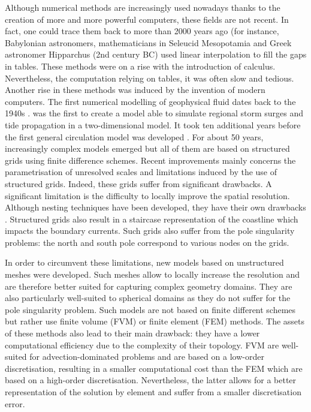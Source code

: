 Although numerical methods are increasingly used nowadays thanks to the creation of more and more powerful computers, these fields are not recent. In fact, one could trace them back to more than 2000 years ago (for instance, Babylonian astronomers, mathematicians in Seleucid Mesopotamia and Greek astronomer Hipparchus (2nd century BC) used linear interpolation to fill the gaps in tables. These methods were on a rise with the introduction of calculus. Nevertheless, the computation relying on tables, it was often slow and tedious. Another rise in these methods was induced by the invention of modern computers. The first numerical modelling of geophysical fluid dates back to the 1940s \citep{cushman2011introduction}. \citet{hansen1956theorie} was the first to create a model able to simulate regional storm surges and tide propagation in a two-dimensional model. It took ten additional years before the first general circulation model was developed \citep{bryan1967numerical}. For about 50 years, increasingly complex models emerged but all of them are based on structured grids using finite difference schemes. Recent improvements mainly concerns the parametrisation of unresolved scales and limitations induced by the use of structured grids. Indeed, these grids suffer from significant drawbacks. A significant limitation is the difficulty to locally improve the spatial resolution. Although nesting techniques have been developed, they have their own drawbacks \citep[see, e.g.,][]{hanert2004advection}. Structured grids also result in a staircase representation of the coastline which impacts the boundary currents. Such grids also suffer from the pole singularity problems: the north and south pole correspond to various nodes on the grids.

In order to circumvent these limitations, new models based on unstructured meshes were developed. Such meshes allow to locally increase the resolution and are therefore better suited for capturing complex geometry domains. They are also particularly well-suited to spherical domains as they do not suffer for the pole singularity problem. Such models are not based on finite different schemes but rather use finite volume (FVM) or finite element (FEM) methods. The assets of these methods also lead to their main drawback: they have a lower computational efficiency due to the complexity of their topology. FVM are well-suited for advection-dominated problems and are based on a low-order discretisation, resulting in a smaller computational cost than the FEM which are based on a high-order discretisation. Nevertheless, the latter allows for a better representation of the solution by element and suffer from a smaller discretisation error. 

